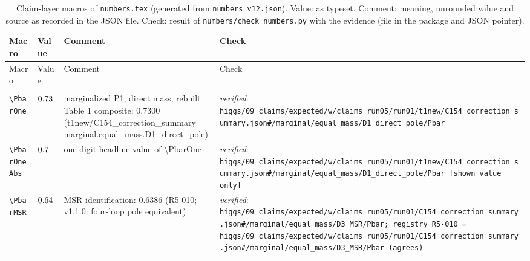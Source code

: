 {\footnotesize
\setlength{\tabcolsep}{4pt}\begin{longtable}{@{}>{\raggedright\arraybackslash}p{}>{\raggedright\arraybackslash}p{}>{\raggedright\arraybackslash}p{}>{\raggedright\arraybackslash}p{}@{}}
\caption{Claim-layer macros of \texttt{numbers.tex} (generated from \texttt{numbers\_v12.json}). Value: as typeset. Comment: meaning, unrounded value and source as recorded in the JSON file. Check: result of \texttt{numbers/check\_numbers.py} with the evidence (file in the package and JSON pointer).}\label{tab:b-macros}\\
\toprule Macro & Value & Comment & Check \\ \midrule\endfirsthead
\toprule Macro & Value & Comment & Check \\ \midrule\endhead
\midrule\multicolumn{4}{r}{\emph{continued}}\\\endfoot\bottomrule\endlastfoot
\texttt{\textbackslash PbarOne} & $0.73$ & marginalized P1, direct mass, rebuilt Table 1 composite: 0.7300 (t1new/\allowbreak{}C154\_\allowbreak{}correction\_\allowbreak{}summary marginal.equal\_\allowbreak{}mass.D1\_\allowbreak{}direct\_\allowbreak{}pole) & \emph{verified}: \texttt{higgs/\allowbreak{}09\_\allowbreak{}claims/\allowbreak{}expected/\allowbreak{}w/\allowbreak{}claims\_\allowbreak{}run05/\allowbreak{}run01/\allowbreak{}t1new/\allowbreak{}C154\_\allowbreak{}correction\_\allowbreak{}summary.json\#/\allowbreak{}marginal/\allowbreak{}equal\_\allowbreak{}mass/\allowbreak{}D1\_\allowbreak{}direct\_\allowbreak{}pole/\allowbreak{}Pbar} \\
\texttt{\textbackslash PbarOneAbs} & $0.7$ & one-digit headline value of \textbackslash{}PbarOne & \emph{verified}: \texttt{higgs/\allowbreak{}09\_\allowbreak{}claims/\allowbreak{}expected/\allowbreak{}w/\allowbreak{}claims\_\allowbreak{}run05/\allowbreak{}run01/\allowbreak{}t1new/\allowbreak{}C154\_\allowbreak{}correction\_\allowbreak{}summary.json\#/\allowbreak{}marginal/\allowbreak{}equal\_\allowbreak{}mass/\allowbreak{}D1\_\allowbreak{}direct\_\allowbreak{}pole/\allowbreak{}Pbar [shown value only]} \\
\texttt{\textbackslash PbarMSR} & $0.64$ & MSR identification: 0.6386 (R5-010; v1.1.0: four-loop pole equivalent) & \emph{verified}: \texttt{higgs/\allowbreak{}09\_\allowbreak{}claims/\allowbreak{}expected/\allowbreak{}w/\allowbreak{}claims\_\allowbreak{}run05/\allowbreak{}run01/\allowbreak{}C154\_\allowbreak{}correction\_\allowbreak{}summary.json\#/\allowbreak{}marginal/\allowbreak{}equal\_\allowbreak{}mass/\allowbreak{}D3\_\allowbreak{}MSR/\allowbreak{}Pbar; registry R5-010 = higgs/\allowbreak{}09\_\allowbreak{}claims/\allowbreak{}expected/\allowbreak{}w/\allowbreak{}claims\_\allowbreak{}run05/\allowbreak{}run01/\allowbreak{}C154\_\allowbreak{}correction\_\allowbreak{}summary.json\#/\allowbreak{}marginal/\allowbreak{}equal\_\allowbreak{}mass/\allowbreak{}D3\_\allowbreak{}MSR/\allowbreak{}Pbar (agrees)} \\

\end{longtable}}
